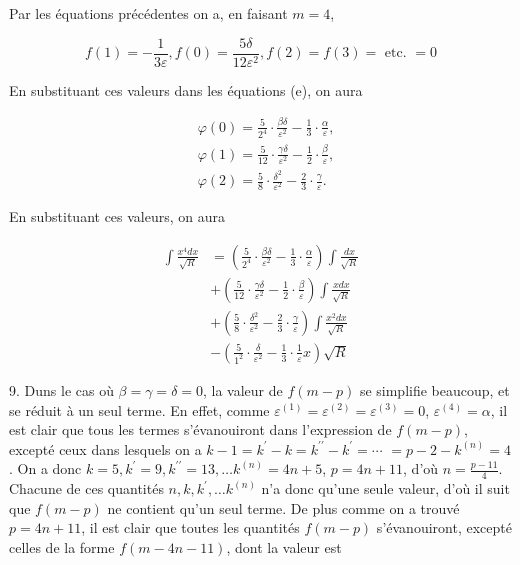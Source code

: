 \documentclass{article}
\begin{document}
Par les équations précédentes on a, en faisant \(m=4\),

\[
f(1)=-\frac{1}{3 \varepsilon}, f(0)=\frac{5 \delta}{12 \varepsilon^{2}}, f(2)=f(3)=\text { etc. }=0
\]

En substituant ces valeurs dans les équations (e), on aura

\[
\begin{aligned}
& \varphi(0)=\frac{5}{2^{4}} \cdot \frac{\beta \delta}{\varepsilon^{2}}-\frac{1}{3} \cdot \frac{\alpha}{\varepsilon}, \\
& \varphi(1)=\frac{5}{12} \cdot \frac{\gamma \delta}{\varepsilon^{2}}-\frac{1}{2} \cdot \frac{\beta}{\varepsilon}, \\
& \varphi(2)=\frac{5}{8} \cdot \frac{\delta^{2}}{\varepsilon^{2}}-\frac{2}{3} \cdot \frac{\gamma}{\varepsilon} .
\end{aligned}
\]

En substituant ces valeurs, on aura

\[
\begin{aligned}
\int \frac{x^{4} d x}{\sqrt{R}} & =\left(\frac{5}{2^{4}} \cdot \frac{\beta \delta}{\varepsilon^{2}}-\frac{1}{3} \cdot \frac{\alpha}{\varepsilon}\right) \int \frac{d x}{\sqrt{R}} \\
& +\left(\frac{5}{12} \cdot \frac{\gamma \delta}{\varepsilon^{2}}-\frac{1}{2} \cdot \frac{\beta}{\varepsilon}\right) \int \frac{x d x}{\sqrt{R}} \\
& +\left(\frac{5}{8} \cdot \frac{\delta^{2}}{\varepsilon^{2}}-\frac{2}{3} \cdot \frac{\gamma}{\varepsilon}\right) \int \frac{x^{2} d x}{\sqrt{R}} \\
& -\left(\frac{5}{1^{2}} \cdot \frac{\delta}{\varepsilon^{2}}-\frac{1}{3} \cdot \frac{1}{\varepsilon} x\right) \sqrt{R}
\end{aligned}
\]

9. Duns le cas où \(\beta=\gamma=\delta=0\), la valeur de \(f(m-p)\) se simplifie beaucoup, et se réduit à un seul terme. En effet, comme \(\varepsilon^{(1)}=\varepsilon^{(2)}=\varepsilon^{(3)}=0\), \(\varepsilon^{(4)}=\alpha\), il est clair que tous les termes s'évanouiront dans l'expression de \(f(m-p)\), excepté ceux dans lesquels on a \(k-1=k^{\prime}-k=k^{\prime \prime}-k^{\prime}=\cdots\) \(=p-2-k^{(n)}=4\). On a donc \(k=5, k^{\prime}=9, k^{\prime \prime}=13, \ldots k^{(n)}=4 n+5\), \(p=4 n+11\), d'où \(n=\frac{p-11}{4}\). Chacune de ces quantités \(n, k, k^{\prime}, \ldots k^{(n)}\) n'a donc qu'une seule valeur, d'où il suit que \(f(m-p)\) ne contient qu'un seul terme. De plus comme on a trouvé \(p=4 n+11\), il est clair que toutes les quantités \(f(m-p)\) s'évanouiront, excepté celles de la forme \(f(m-4 n-11)\), dont la valeur est
\end{document}
